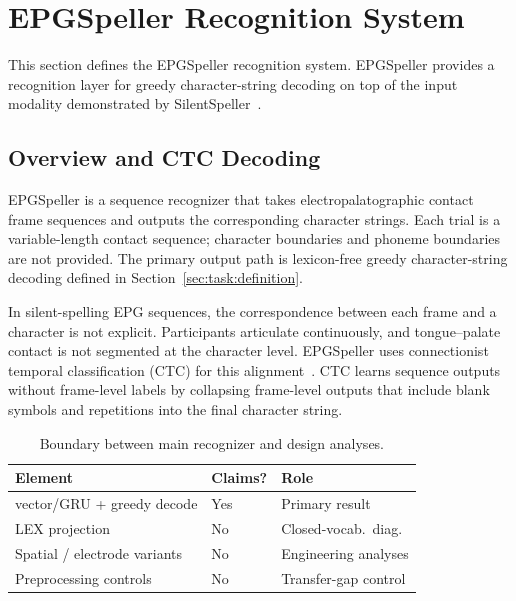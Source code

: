 \section{EPGSpeller Recognition System}
\label{sec:system}

This section defines the EPGSpeller recognition system.
EPGSpeller provides a recognition layer for greedy character-string decoding on top of the input modality demonstrated by SilentSpeller~\cite{kimura2022silentspeller}.

\subsection{Overview and CTC Decoding}

EPGSpeller is a sequence recognizer that takes electropalatographic contact frame sequences and outputs the corresponding character strings.
Each trial is a variable-length contact sequence; character boundaries and phoneme boundaries are not provided.
The primary output path is lexicon-free greedy character-string decoding defined in Section~\ref{sec:task:definition}.

In silent-spelling EPG sequences, the correspondence between each frame and a character is not explicit.
Participants articulate continuously, and tongue--palate contact is not segmented at the character level.
EPGSpeller uses connectionist temporal classification (CTC) for this alignment~\cite{graves2006connectionist}.
CTC learns sequence outputs without frame-level labels by collapsing frame-level outputs that include blank symbols and repetitions into the final character string.

\begin{table}[!b]
\centering
\caption{Boundary between main recognizer and design analyses.}
\label{tab:recognizer_design}
\setlength{\tabcolsep}{1.5pt}
\renewcommand{\arraystretch}{1.03}
\begin{tabular}{@{}p{}p{}p{}@{}}
\toprule
Element & Claims? & Role \\
\midrule
vector/GRU + greedy decode & Yes & Primary result \\
LEX projection & No & Closed-vocab.\ diag. \\
Spatial / electrode variants & No & Engineering analyses \\
Preprocessing controls & No & Transfer-gap control \\
\bottomrule
\end{tabular}
\end{table}

